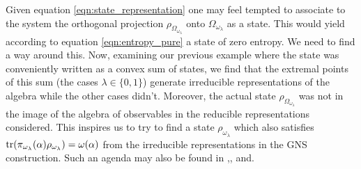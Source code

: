 Given equation \ref{eqn:state_representation} one may feel tempted to associate to the system the orthogonal projection $\rho_{\Omega_{\omega_\lambda}}$ onto $\Omega_{\omega_\lambda}$ as a state. This would yield according to equation \ref{eqn:entropy_pure} a state of zero entropy. We need to find a way around this. Now, examining our previous example where the state was conveniently written as a convex sum of states, we find that the extremal points of this sum (the cases $\lambda\in\{0,1\}$) generate irreducible representations of the algebra while the other cases didn't. Moreover, the actual state $\rho_{\Omega_{\omega_\lambda}}$ was not in the image of the algebra of observables in the reducible representations considered. This inspires us to try to find a state $\rho_{\omega_\lambda}$ which also satisfies $\operatorname{tr}(\pi_{\omega_\lambda}(\alpha)\rho_{\omega_\lambda})=\omega(\alpha)$ from the irreducible representations in the GNS construction. Such an agenda may also be found in \cite{Balachandran2013c} ,\cite{Balachandran2013b}, \cite{Balachandran2013} and\cite{Balachandran2013a}.

